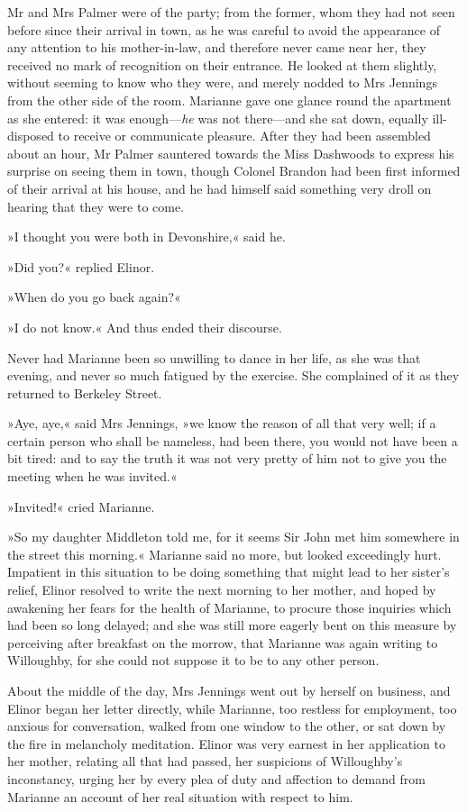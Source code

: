 Mr and Mrs Palmer were of the party; from the former, whom they had not seen before since their arrival in town, as he was careful to avoid the appearance of any attention to his mother-in-law, and therefore never came near her, they received no mark of recognition on their entrance. He looked at them slightly, without seeming to know who they were, and merely nodded to Mrs Jennings from the other side of the room. Marianne gave one glance round the apartment as she entered: it was enough—\textit{he} was not there—and she sat down, equally ill-disposed to receive or communicate pleasure. After they had been assembled about an hour, Mr Palmer sauntered towards the Miss Dashwoods to express his surprise on seeing them in town, though Colonel Brandon had been first informed of their arrival at his house, and he had himself said something very droll on hearing that they were to come.

»I thought you were both in Devonshire,« said he.

»Did you?« replied Elinor.

»When do you go back again?«

»I do not know.« And thus ended their discourse.

Never had Marianne been so unwilling to dance in her life, as she was that evening, and never so much fatigued by the exercise. She complained of it as they returned to Berkeley Street.

»Aye, aye,« said Mrs Jennings, »we know the reason of all that very well; if a certain person who shall be nameless, had been there, you would not have been a bit tired: and to say the truth it was not very pretty of him not to give you the meeting when he was invited.«

»Invited!« cried Marianne.

»So my daughter Middleton told me, for it seems Sir John met him somewhere in the street this morning.« Marianne said no more, but looked exceedingly hurt. Impatient in this situation to be doing something that might lead to her sister’s relief, Elinor resolved to write the next morning to her mother, and hoped by awakening her fears for the health of Marianne, to procure those inquiries which had been so long delayed; and she was still more eagerly bent on this measure by perceiving after breakfast on the morrow, that Marianne was again writing to Willoughby, for she could not suppose it to be to any other person.

About the middle of the day, Mrs Jennings went out by herself on business, and Elinor began her letter directly, while Marianne, too restless for employment, too anxious for conversation, walked from one window to the other, or sat down by the fire in melancholy meditation. Elinor was very earnest in her application to her mother, relating all that had passed, her suspicions of Willoughby’s inconstancy, urging her by every plea of duty and affection to demand from Marianne an account of her real situation with respect to him.


